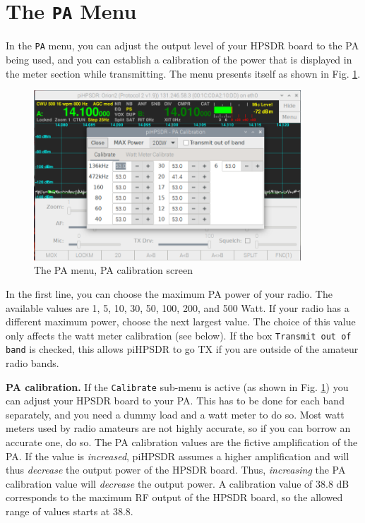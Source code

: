\documentclass[12pt]{book}
\def\rett#1{\texttt{\color{red}#1}}
\def\bltt#1{\texttt{\color{blue}#1}}
\def\pH{pi\-HPSDR\xspace}
\begin{document}
\section{The \texttt{PA} Menu}

In the \bltt{PA} menu, you can adjust the output level of your HPSDR board
to the PA being used, and you can establish a calibration of the
power that is displayed in the meter section while transmitting.
The menu presents itself as shown in Fig. \ref{fig:PAMenuCalibrate}.

\begin{figure}[ht]
\center
\includegraphics[width=10cm]{PAmenuCalibrate.png}
\caption{The PA menu, PA calibration screen}
\label{fig:PAMenuCalibrate}
\end{figure}

In the first line, you can choose the maximum PA power of your
radio. The available values are 1, 5, 10, 30, 50, 100, 200, and
500 Watt. If your radio has a different maximum power, choose the
next largest value. The choice of this value only affects the
watt meter calibration (see below). If the  box
\rett{Transmit out of band} is checked, this allows \pH
to go TX if you are outside of the amateur radio bands.



\textbf{PA calibration.} If the \rett{Calibrate} sub-menu is active
(as shown in Fig. \ref{fig:PAMenuCalibrate}) you can adjust your
HPSDR board to your PA. This has to be done for each band separately,
and you need a dummy load and a watt meter to do so. Most watt meters
used by radio amateurs are not highly accurate, so if you can borrow
an accurate one, do so. The PA calibration values are the fictive
amplification of the PA. If the value is \textit{increased},
\pH assumes a higher amplification and will thus \textit{decrease}
the output power of the HPSDR board. Thus, \textit{increasing} the
PA calibration value will \textit{decrease} the output power. A calibration
value of 38.8 dB corresponds to the maximum RF output of the HPSDR board,
so the allowed range of values starts at 38.8.
\end{document}

